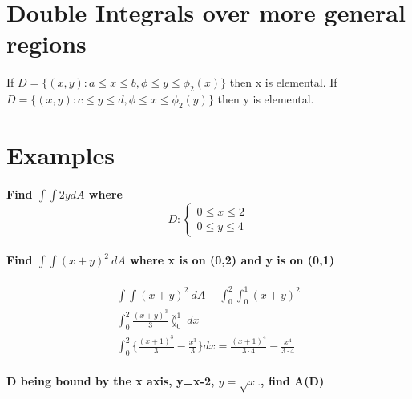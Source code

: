 \documentclass[11pt,fleqn]{book} %
\begin{document}
\section{Double Integrals over more general regions}

If $D = \{ (x,y) : a \leq x \leq b, \phi \leq y \leq \phi_2(x)  \}$
then x is elemental. If $D = \{ (x,y) : c \leq y \leq d, \phi \leq x \leq \phi_2(y)  \}$
then y is elemental.

\section{Examples}
\paragraph{Find $\int \int 2y dA$ where $$D: \begin{cases}
    0 \leq x \leq 2\\
    0 \leq y \leq 4
\end{cases}$$}

\paragraph{Find $\int \int (x+y)^2 \ dA$ where x is on (0,2) and y is on (0,1)}
\begin{gather}
    \int \int (x+y)^2 \ dA + \int_0^2 \int_0^1 (x+y)^2\\
    \int_0^2 \frac{(x+y)^3}{3} \between_0^1 \ dx \\
    \int_0^2 \{ \frac{(x+1)^3}{3} - \frac{x^3}{3} \} dx = \frac{(x+1)^4}{3 \cdot 4} - \frac{x^4}{3 \cdot 4} 
\end{gather}

\paragraph*{D being bound by the x axis, y=x-2, $y = \sqrt{x}.$, find A(D)}



\end{document}
